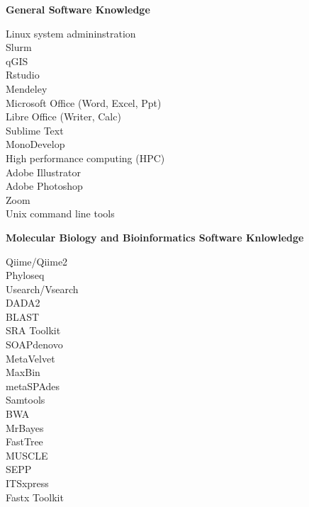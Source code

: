 \documentclass{article}
\begin{document}
\pagebreak
{\large  \textbf{General Software Knowledge}}
  \begin{adjustwidth}{2mm}{}\begin{multicols}{3}
    Linux system admininstration\\
    Slurm\\
    qGIS\\
    Rstudio\\
    Mendeley\\
    Microsoft Office (Word, Excel, Ppt)\\
    Libre Office (Writer, Calc)\\
    Sublime Text\\
    MonoDevelop\\
    High performance computing (HPC)\\
    Adobe Illustrator\\
    Adobe Photoshop\\
    Zoom\\
    Unix command line tools
  \end{multicols}\end{adjustwidth}

\vspace{3mm}
{\large  \textbf{Molecular Biology and Bioinformatics Software Knlowledge}}
  \begin{adjustwidth}{2mm}{}\begin{multicols}{3}
    Qiime/Qiime2\\
    Phyloseq\\
    Usearch/Vsearch\\
    DADA2\\
    BLAST\\
    SRA Toolkit\\
    SOAPdenovo\\
    MetaVelvet\\
    MaxBin\\
    metaSPAdes\\
    Samtools\\
    BWA\\
    MrBayes\\
    FastTree\\
    MUSCLE\\
    SEPP\\
    ITSxpress\\
    Fastx Toolkit
  \end{multicols}\end{adjustwidth}
\end{document}
